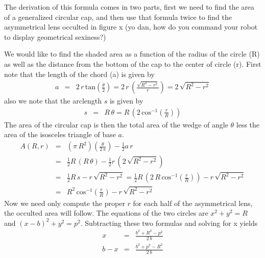 \documentclass[12pt,preprint]{aastex}
\begin{document}
The derivation of this formula comes in two parts, first we need to find the
area of a generalized circular cap, and then use that formula twice to find
the asymmetrical lens occulted in figure x (yo dan, how do you command your
robot to display geometrical sexiness?)

%

We would like to find the shaded area as a function of the radius of the
circle (R) as well as the distance from the bottom of the cap to the center
of circle (r).
First note that the length of the chord (a) is given by
\begin{eqnarray}
    a & = & 2 \, r \, \mathrm{tan} \left( \frac{\theta}{2} \right) = 2 \, r \,
        \left( \frac{\sqrt{R^2 - r^2}}{r} \right) = 2 \, \sqrt{R^2 - r^2}
\end{eqnarray}
also we note that the arclength $s$ is given by
\begin{eqnarray}
    s & = & R \, \theta = R \, \left( 2 \, \mathrm{cos}^{-1}
                          \left( \frac{r}{R} \right) \right)
\end{eqnarray}
The area of the circular cap is then the total area of the wedge of angle
$\theta$ less the area of the isosceles triangle of base $a$.
\begin{eqnarray}
    A(R,r) & = & (\pi \, R^2) \left( \frac{\theta}{2 \, \pi} \right)
                                    - \frac{1}{2} a \, r \\
           & = & \frac{1}{2} R \, (R \, \theta) - \frac{1}{2} r \, ( 2 \,
                                    \sqrt{R^2 - r^2} ) \\
           & = & \frac{1}{2} R \, s - r \, \sqrt{R^2 - r^2} = \frac{1}{2} R
                                    \, \left( 2 \, R \, \mathrm{cos}^{-1}
                                    \left( \frac{r}{R} \right) \right)
                                    - r \, \sqrt{R^2 - r^2} \\
           & = & R^2 \, \mathrm{cos}^{-1} \left( \frac{r}{R} \right)
                                    - r \, \sqrt{R^2 - r^2}
\end{eqnarray}
Now we need only compute the proper $r$ for each half of the asymmetrical
lens, the occulted area will follow.
The equations of the two circles are $x^2 + y^2 = R$ and $(x-b)^2 + y^2 = p^2$.
Subtracting these two formulas and solving for x yields
\begin{eqnarray}
    x & = & \frac{b^2 + R^2 - p^2}{2 \, b} \\
    b - x & = & \frac{b^2 + p^2 - R^2}{2 \, b}
\end{eqnarray}
\end{document}
